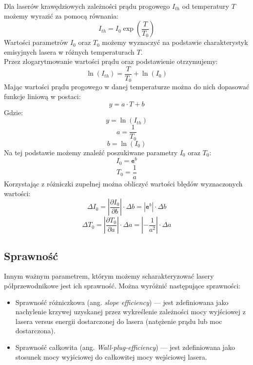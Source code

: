 \documentclass[a4paper, portrait,12pt]{report}
\begin{document}
\newpage
Dla laserów krawędziowych zależności prądu progowego $I_{th}$ od temperatury $T$ możemy wyrazić za pomocą równania:
\begin{equation}
I_{th} = I_0 \exp \left( \frac{T}{T_0} \right)
\end{equation}
Wartości parametrów $I_0$ oraz $T_0$ możemy wyznaczyć na podstawie charakterystyk
emisyjnych lasera w różnych temperaturach $T$. \\
Przez zlogarytmowanie wartości prądu oraz podstawienie otrzymujemy:
\begin{equation}
\ln(I_{th}) =    \frac{T}{T_0}  + \ln(I_0)
\end{equation}
Mając wartości prądu progowego w danej temperaturze  można do nich dopasować funkcje liniową w postaci:
\begin{equation}
y = a \cdot T + b
\end{equation}
Gdzie:
\begin{equation}
y = \ln(I_{th})
\end{equation}
\begin{equation}
a = \frac{1}{T_0}
\end{equation}
\begin{equation}
b = \ln(I_0)
\end{equation}
Na tej podstawie możemy znaleźć poszukiwane parametry $I_0$ oraz $T_0$:
\begin{equation}
I_0 = \mathtt{e}^b
\end{equation}
\begin{equation}
T_0 = \frac{1}{a}
\end{equation}
Korzystając z różniczki zupełnej można obliczyć wartości błędów wyznaczonych wartości:
\begin{equation}
\Delta I_0 = \left\lvert \frac{\partial I_{0}}{\partial b} \right\rvert \cdot \Delta b = | \mathtt{e}^b | \cdot \Delta b
\end{equation}
\begin{equation}
\Delta T_0 = \left\lvert \frac{\partial T_{0}}{\partial a} \right\rvert \cdot \Delta a = \left\lvert -\frac{1}{a^2} \right\rvert \cdot \Delta a
\end{equation}
\subsection{Sprawność}
Innym ważnym parametrem, którym możemy scharakteryzować lasery półprzewodnikowe jest ich sprawność. Można wyróżnić następujące sprawności:
\begin{itemize}
\item Sprawność różniczkowa (ang. \textit{slope efficiency}) --- jest zdefiniowana jako nachylenie krzywej uzyskanej przez wykreślenie zależności mocy wyjściowej z lasera versus energii dostarczonej do lasera (natężenie prądu lub moc dostarczona).
\item Sprawność całkowita (ang. \textit{Wall-plug-efficiency}) --- jest zdefiniowana jako stosunek mocy wyjściowej do całkowitej mocy wejściowej lasera.
\end{itemize}
\end{document}

